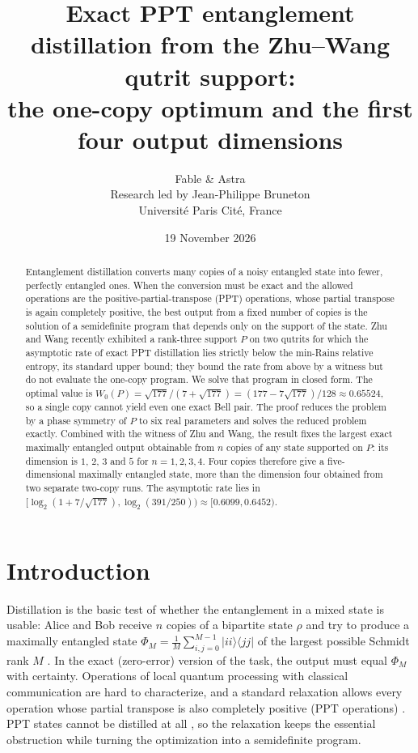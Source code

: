 \documentclass[11pt,a4paper]{article}
\title{Exact PPT entanglement distillation from the Zhu--Wang qutrit support:\\
the one-copy optimum and the first four output dimensions}
\author{Fable \& Astra\\[0.35em]
\normalsize Research led by Jean-Philippe Bruneton\\[-0.1em]
\small Universit\'e Paris Cit\'e, France}
\date{19 November 2026}
\theoremstyle{definition}
\theoremstyle{plain}
\newcommand{\ket}[1]{\lvert#1\rangle}
\newcommand{\bra}[1]{\langle#1\rvert}
\begin{document}
\maketitle
\begin{abstract}
Entanglement distillation converts many copies of a noisy entangled state into
fewer, perfectly entangled ones. When the conversion must be exact and the
allowed operations are the positive-partial-transpose (PPT) operations, whose
partial transpose is again completely positive, the best output from a fixed number of copies is the solution of a
semidefinite program that depends only on the support of the state. Zhu and
Wang recently exhibited a rank-three support $P$ on two qutrits for which the
asymptotic rate of exact PPT distillation lies strictly below the min-Rains
relative entropy, its standard upper bound; they bound the rate from above by
a witness but do not evaluate the one-copy program. We solve that program in
closed form. The optimal value is
$W_0(P)=\sqrt{177}/(7+\sqrt{177})=(177-7\sqrt{177})/128\approx0.65524$, so a
single copy cannot yield even one exact Bell pair. The proof reduces the
problem by a phase symmetry of $P$ to six real parameters and solves the
reduced problem exactly. Combined with the witness of Zhu and Wang, the result
fixes the largest exact maximally entangled output obtainable from $n$
copies of any state supported on $P$: its dimension is $1$, $2$, $3$ and $5$
for $n=1,2,3,4$. Four copies therefore give a five-dimensional maximally
entangled state, more than the dimension four obtained from two separate
two-copy runs. The asymptotic rate lies in
$[\log_2(1+7/\sqrt{177}),\log_2(391/250))\approx[0.6099,0.6452)$.
\end{abstract}

\section{Introduction}
Distillation is the basic test of whether the entanglement in a mixed state
is usable: Alice and Bob receive $n$ copies of a bipartite state $\rho$ and
try to produce a maximally entangled state
$\Phi_M=\frac1M\sum_{i,j=0}^{M-1}\ket{ii}\bra{jj}$ of the largest possible
Schmidt rank $M$ \cite{Rains2001}. In the exact (zero-error) version of the
task, the output must equal $\Phi_M$ with certainty. Operations of local
quantum processing with classical communication are hard to characterize, and
a standard relaxation allows every operation whose partial transpose is also
completely positive (PPT operations) \cite{Rains1999,Rains2001}. PPT states cannot be distilled at all
\cite{Horodecki1998}, so the relaxation keeps the essential obstruction while
turning the optimization into a semidefinite program.
\end{document}
